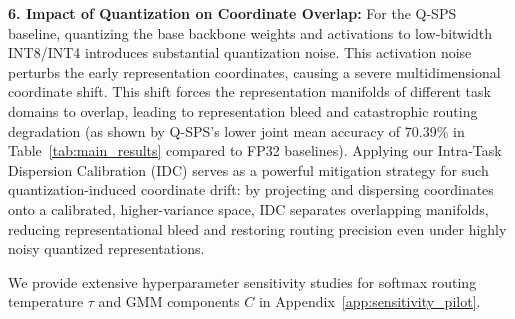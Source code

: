 \textbf{6. Impact of Quantization on Coordinate Overlap:} For the Q-SPS baseline, quantizing the base backbone weights and activations to low-bitwidth INT8/INT4 introduces substantial quantization noise. This activation noise perturbs the early representation coordinates, causing a severe multidimensional coordinate shift. This shift forces the representation manifolds of different task domains to overlap, leading to representation bleed and catastrophic routing degradation (as shown by Q-SPS's lower joint mean accuracy of 70.39\% in Table~\ref{tab:main_results} compared to FP32 baselines). Applying our Intra-Task Dispersion Calibration (IDC) serves as a powerful mitigation strategy for such quantization-induced coordinate drift: by projecting and dispersing coordinates onto a calibrated, higher-variance space, IDC separates overlapping manifolds, reducing representational bleed and restoring routing precision even under highly noisy quantized representations.

We provide extensive hyperparameter sensitivity studies for softmax routing temperature $\tau$ and GMM components $C$ in Appendix~\ref{app:sensitivity_pilot}.
